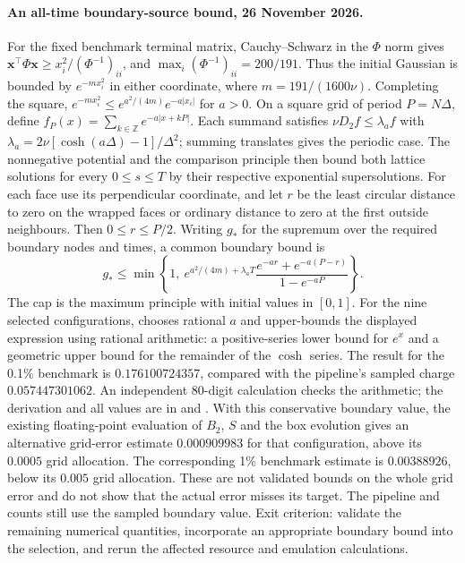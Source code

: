 \documentclass[11pt,a4paper]{article}
\newcommand{\x}{\mathbf x}
\begin{document}
\paragraph{An all-time boundary-source bound, 26 November 2026.}
For the fixed benchmark terminal matrix, Cauchy--Schwarz in the $\Phi$ norm
gives $\x^\top\Phi\x\ge x_i^2/(\Phi^{-1})_{ii}$, and
$\max_i(\Phi^{-1})_{ii}=200/191$. Thus the initial Gaussian is bounded by
$e^{-m x_i^2}$ in either coordinate, where $m=191/(1600\nu)$. Completing
the square, $e^{-m x_i^2}\le e^{a^2/(4m)}e^{-a|x_i|}$ for $a>0$.
On a square grid of period $P=N\Delta$, define
$f_P(x)=\sum_{k\in\mathbb Z}e^{-a|x+kP|}$. Each summand satisfies
$\nu D_2 f\le\lambda_a f$ with
$\lambda_a=2\nu[\cosh(a\Delta)-1]/\Delta^2$; summing translates gives the
periodic case. The nonnegative potential and the comparison principle then
bound both lattice solutions for every $0\le s\le T$ by their respective
exponential supersolutions. For each face use its perpendicular coordinate,
and let $r$ be the least circular distance to zero on the wrapped faces or
ordinary distance to zero at the first outside neighbours. Then
$0\le r\le P/2$. Writing $g_*$ for the supremum over the required boundary
nodes and times, a common boundary bound is
\[
 g_*\le\min\!\left\{1,\ e^{a^2/(4m)+\lambda_a T}
 \frac{e^{-ar}+e^{-a(P-r)}}{1-e^{-aP}}\right\}.
\]
The cap is the maximum principle with initial values in $[0,1]$. For the nine
selected configurations, 
chooses rational $a$ and upper-bounds the displayed expression using rational
arithmetic: a positive-series lower bound for $e^x$ and a geometric upper
bound for the remainder of the $\cosh$ series. The result for the 0.1\%
benchmark is $0.176100724357$, compared with the pipeline's sampled charge
$0.057447301062$. An independent 80-digit calculation checks the arithmetic;
the derivation and all values are in 
and . With this conservative
boundary value, the existing floating-point evaluation of $B_2$, $S$ and the
box evolution gives an alternative grid-error estimate $0.000909983$ for that
configuration, above its $0.0005$ grid allocation. The corresponding 1\%
benchmark estimate is $0.00388926$, below its $0.005$ grid allocation. These
are not validated bounds on the whole grid error and do not show that the
actual error misses its target. The pipeline and counts still use the sampled
boundary value. Exit criterion: validate the remaining numerical quantities,
incorporate an appropriate boundary bound into the selection, and rerun the
affected resource and emulation calculations.
\end{document}
